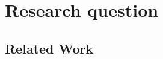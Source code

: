 \section{Research question}
\label{sec:research-question}

\subsection{Related Work}
\label{sec:related-work}

%
%
%
%
%
%
%
